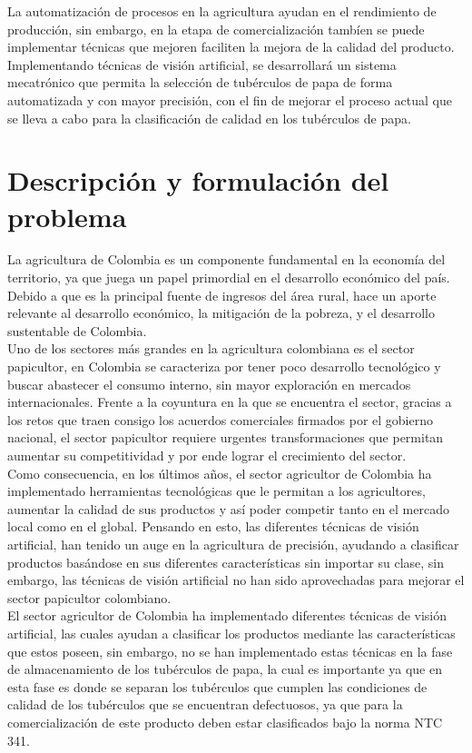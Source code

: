 La automatización de procesos en la agricultura ayudan en el rendimiento de producción, sin embargo, en la etapa de comercialización tambíen se puede implementar técnicas que mejoren faciliten la mejora de la calidad del producto. Implementando técnicas de visión artificial, se desarrollará un sistema mecatrónico que permita la selección de tubérculos de papa de forma automatizada y con mayor precisión, con el fin de mejorar el proceso actual que se lleva a cabo para la clasificación de calidad en los tubérculos de papa.


\section{Descripción y formulación del problema}
La agricultura de Colombia es un componente fundamental en la economía del territorio, ya que juega un papel primordial en el desarrollo económico del país. Debido a que es la principal fuente de ingresos del área rural, hace un aporte relevante al desarrollo económico, la mitigación de la pobreza, y el desarrollo sustentable de Colombia.\\


Uno de los sectores más grandes en la agricultura colombiana es el sector papicultor, en Colombia se caracteriza por tener poco desarrollo tecnológico y buscar abastecer el consumo interno, sin mayor exploración en mercados internacionales. Frente a la coyuntura en la que se encuentra el sector, gracias a los retos que traen consigo los acuerdos comerciales firmados por el gobierno nacional, el sector papicultor requiere urgentes transformaciones que permitan aumentar su competitividad y por ende lograr el crecimiento del sector.\\


Como consecuencia, en los últimos años, el sector agricultor de Colombia ha implementado herramientas tecnológicas que le permitan a los agricultores, aumentar la calidad de sus productos y así poder competir tanto en el mercado local como en el global. Pensando en esto, las diferentes técnicas de visión artificial, han tenido un auge en la agricultura de precisión, ayudando a clasificar productos basándose en sus diferentes características sin importar su clase, sin embargo, las técnicas de visión artificial no han sido aprovechadas para mejorar el sector papicultor colombiano.\\

El sector agricultor de Colombia ha implementado diferentes técnicas de visión artificial, las cuales ayudan a clasificar los productos mediante las características que estos poseen, sin embargo, no se han implementado estas técnicas en la fase de almacenamiento de los tubérculos de papa, la cual es importante ya que en esta fase es donde se separan los tubérculos que cumplen las condiciones de calidad de los tubérculos que se encuentran defectuosos, ya que para la comercialización de este producto deben estar clasificados bajo la norma NTC 341.\\

